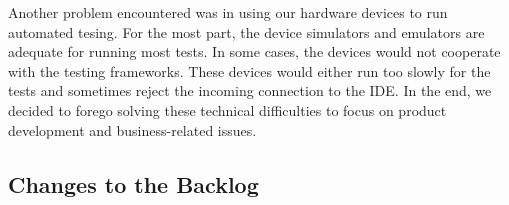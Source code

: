 Another problem encountered was in using our hardware devices to run automated
tesing. For the most part, the device simulators and emulators are adequate for
running most tests. In some cases, the devices would not cooperate with the
testing frameworks. These devices would either run too slowly for the tests and
sometimes reject the incoming connection to the IDE. In the end, we decided to
forego solving these technical difficulties to focus on product development and
business-related issues.


\subsection{Changes to the Backlog}

